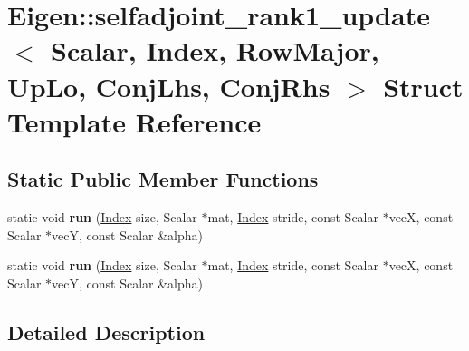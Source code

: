 \hypertarget{struct_eigen_1_1selfadjoint__rank1__update_3_01_scalar_00_01_index_00_01_row_major_00_01_up_lo_03a9dcf0deae11b1da493e4caae5cd21a}{}\section{Eigen\+:\+:selfadjoint\+\_\+rank1\+\_\+update$<$ Scalar, Index, Row\+Major, Up\+Lo, Conj\+Lhs, Conj\+Rhs $>$ Struct Template Reference}
\label{struct_eigen_1_1selfadjoint__rank1__update_3_01_scalar_00_01_index_00_01_row_major_00_01_up_lo_03a9dcf0deae11b1da493e4caae5cd21a}
\subsection*{Static Public Member Functions}
\begin{DoxyCompactItemize}
\item 
\mbox{\label{struct_eigen_1_1selfadjoint__rank1__update_3_01_scalar_00_01_index_00_01_row_major_00_01_up_lo_03a9dcf0deae11b1da493e4caae5cd21a_a99819a805869dbd3010c72cbb07848fd}} 
static void {\bfseries run} (\hyperlink{namespace_eigen_a62e77e0933482dafde8fe197d9a2cfde}{Index} size, Scalar $\ast$mat, \hyperlink{namespace_eigen_a62e77e0933482dafde8fe197d9a2cfde}{Index} stride, const Scalar $\ast$vecX, const Scalar $\ast$vecY, const Scalar \&alpha)
\item 
\mbox{\label{struct_eigen_1_1selfadjoint__rank1__update_3_01_scalar_00_01_index_00_01_row_major_00_01_up_lo_03a9dcf0deae11b1da493e4caae5cd21a_a99819a805869dbd3010c72cbb07848fd}} 
static void {\bfseries run} (\hyperlink{namespace_eigen_a62e77e0933482dafde8fe197d9a2cfde}{Index} size, Scalar $\ast$mat, \hyperlink{namespace_eigen_a62e77e0933482dafde8fe197d9a2cfde}{Index} stride, const Scalar $\ast$vecX, const Scalar $\ast$vecY, const Scalar \&alpha)
\end{DoxyCompactItemize}


\subsection{Detailed Description}
